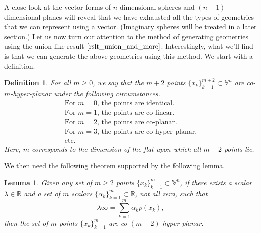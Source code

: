 \documentclass[12pt]{article}
\newcommand{\V}{\mathbb{V}}
\newcommand{\R}{\mathbb{R}}
\newcommand{\nvai}{\infty}
\newtheorem{definition}{Definition}[section]
\newtheorem{lemma}{Lemma}[section]
\begin{document}
A close look at the vector forms of $n$-dimensional spheres and $(n-1)$-dimensional
planes will reveal that we have exhausted all the types of geometries that we can
represent using a vector.  (Imaginary spheres will be treated in a later section.)
Let us now turn our attention to the method of generating
geometries using the union-like result $\eqref{rslt_union_and_more}$.  Interestingly, what we'll
find is that we can generate the above geometries using this method.
We start with a definition.
\begin{definition}\label{def_co_hyper_planar}
For all $m\geq 0$, we say that the $m+2$ points $\{x_k\}_{k=1}^{m+2}\subset\V^n$
are co-$m$-hyper-planar under the following circumstances.
\begin{equation*}
\begin{array}{l}
\mbox{For $m=0$, the points are identical.} \\
\mbox{For $m=1$, the points are co-linear.} \\
\mbox{For $m=2$, the points are co-planar.} \\
\mbox{For $m=3$, the points are co-hyper-planar.} \\
\mbox{etc.}
\end{array}
\end{equation*}
Here, $m$ corresponds to the dimension of the flat upon which all $m+2$
points lie.
\end{definition}
We then need the following theorem supported by the following lemma.
\begin{lemma}\label{lma_lin_combo_points_is_inf}
Given any set of $m\geq 2$ points $\{x_k\}_{k=1}^m\subset\V^n$, if there exists
a scalar $\lambda\in\R$ and a set of $m$ scalars $\{\alpha_k\}_{k=1}^m\subset\R$, not all zero, such that
\begin{equation*}
\lambda\nvai = \sum_{k=1}^m\alpha_k p(x_k),
\end{equation*}
then the set of $m$ points $\{x_k\}_{k=1}^m$ are co-$(m-2)$-hyper-planar.
\end{lemma}
\end{document}
